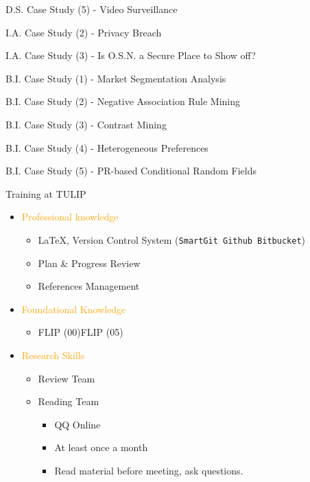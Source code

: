 \documentclass[
 size=14pt,
 paper=smartboard,  %
 mode=present, 		%
 display=slides, 	%
 style=tuliplab,  	%
 pauseslide,
 fleqn,leqno]{powerdot}
\newcommand{\draftnote}[3]{
	\todo[author=#2,color=#1!30,size=\footnotesize]{\textsf{#3}}	}
\newcommand{\gangli}[1]{\draftnote{blue}{GLi:}{#1}}
\begin{document}
\begin{slide}[toc=,bm=]{D.S. Case Study (5) - Video Surveillance}
\begin{slide}[toc=,bm=]{I.A. Case Study (2) - Privacy Breach}
\begin{slide}[toc=,bm=]{I.A. Case Study (3) - Is O.S.N. a Secure Place to Show off?}
\begin{slide}[toc=,bm=]{B.I. Case Study (1) - Market Segmentation Analysis}
\begin{slide}[toc=,bm=]{B.I. Case Study (2) - Negative Association Rule Mining}
\begin{slide}[toc=,bm=]{B.I. Case Study (3) - Contrast Mining}
\begin{slide}[toc=,bm=]{B.I. Case Study (4) - Heterogeneous Preferences}
\begin{slide}[toc=,bm=]{B.I. Case Study (5) - PR-based Conditional Random Fields}
\begin{slide}{Training at TULIP}
\begin{itemize}
  \item \textcolor{orange}{Professional knowledge}
    \begin{itemize}
          \item \LaTeX{},
                Version Control System (\texttt{SmartGit Github Bitbucket})
          \item Plan \& Progress Review
          \item References Management
        \end{itemize}
  \item \textcolor{orange}{Foundational Knowledge}
    \begin{itemize}
      \item FLIP (00)\texttildelow FLIP (05)
    \end{itemize}
  \item \textcolor{orange}{Research Skills}
    \begin{itemize}
      \item Review Team
      \item Reading Team
        \begin{itemize}
          \item QQ Online
          \item At least once a month
          \item Read material before meeting,
                ask questions.
        \end{itemize}
    \end{itemize}
\end{itemize}
\end{slide}



\end{slide}
\end{slide}
\end{slide}
\end{slide}
\end{slide}
\end{slide}
\end{slide}
\end{slide}
\end{document}
